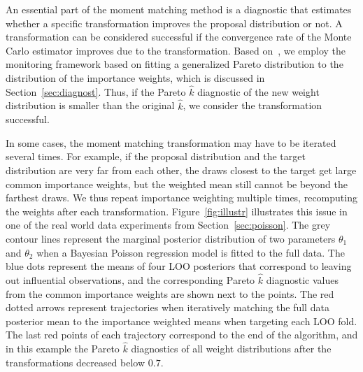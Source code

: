 \documentclass[12pt]{article}
\begin{document}
An essential part of the moment matching method is a diagnostic that estimates whether a specific transformation
improves the proposal distribution or not.
A transformation can be considered successful if the convergence rate of the Monte Carlo estimator
improves due to the transformation.
Based on~\citet{vehtari2017practical}, we employ the monitoring framework based on fitting a
generalized Pareto distribution to the distribution of the importance weights, which is discussed in Section~\ref{sec:diagnost}.
Thus, if the Pareto $\hat{k}$ diagnostic of the new weight distribution is smaller
than the original $\hat{k}$, we consider the transformation
successful.
%
%
%
















%
%


In some cases, the moment matching transformation may have to be iterated
several times.
For example, if the proposal distribution and the target distribution are very far from each other,
the draws closest to the target get large common importance weights, but
the weighted mean still cannot be beyond the farthest draws.
We thus repeat importance weighting multiple times, recomputing the weights after each transformation.
Figure~\ref{fig:illustr} illustrates this issue
in one of the real world data experiments from Section~\ref{sec:poisson}.
The grey contour lines represent the marginal posterior distribution of two parameters
$\theta_1$ and $\theta_2$ when a Bayesian Poisson regression model is fitted to the full data.
The blue dots represent the means of four
LOO posteriors that correspond to leaving out influential observations, and
the corresponding Pareto $\hat{k}$ diagnostic values from the common importance weights
are shown next to the points.
The red dotted arrows represent trajectories
when iteratively matching the full data posterior mean to the importance weighted means
when targeting each LOO fold.
The last red points of each trajectory correspond to the end of
the algorithm, and in this example the Pareto $\hat{k}$ diagnostics of all
weight distributions after the transformations decreased below $0.7$.
\end{document}
